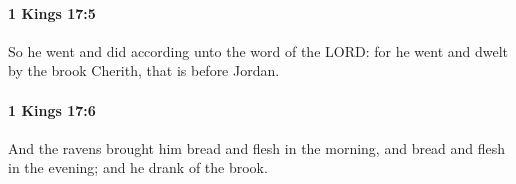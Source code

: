 		\paragraph{1 Kings 17:5} %
			\label{1KINGS-17-5}

			So he went and did according unto the word of the LORD: for he went and dwelt by the brook Cherith, that is before Jordan.


		\paragraph{1 Kings 17:6} %
			\label{1KINGS-17-6}

			And the ravens brought him bread and flesh in the morning, and bread and flesh in the evening; and he drank of the brook.


